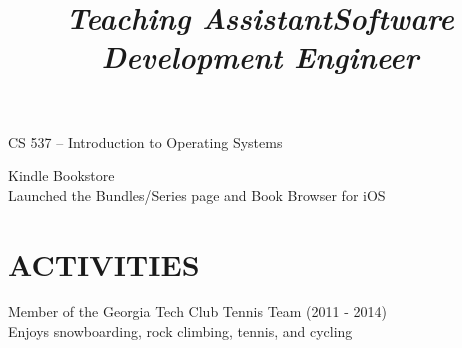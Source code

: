 \documentclass[margin,11pt]{res}
\begin{document}
\begin{resume}
\title{\sl{Teaching Assistant}}
\begin{position}
CS 537 – Introduction to Operating Systems
\end{position}

\title{\sl{Software Development Engineer}}
\begin{position}
Kindle Bookstore\\
Launched the Bundles/Series page and Book Browser for iOS
\end{position}

\section{ACTIVITIES}
Member of the Georgia Tech Club Tennis Team (2011 - 2014)\\
Enjoys snowboarding, rock climbing, tennis, and cycling

\end{resume}
\end{document}
